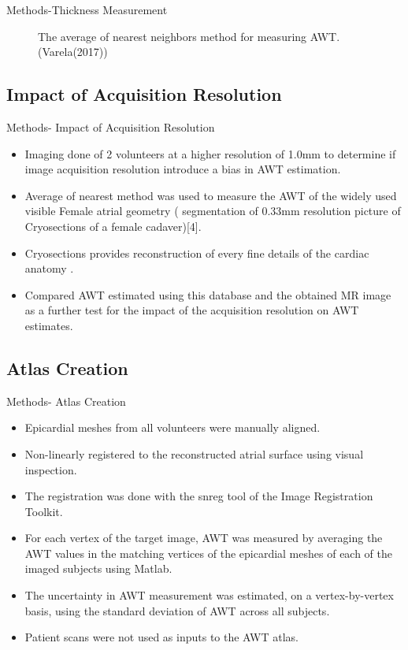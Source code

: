 \documentclass[aspectratio=43]{beamer}
\begin{document}
\begin{frame}{Methods-Thickness Measurement}
\begin{minipage}{0.2\textwidth}
\begin{figure}[h!]
\caption {The average of nearest neighbors method for measuring AWT.(Varela(2017))}
\end{figure}
\end{minipage}

\noindent


\newpage
\subsection{Impact of Acquisition Resolution}
\end{frame}
 
 \begin{frame}{Methods- Impact of Acquisition Resolution}
 \begin{itemize}
 \item Imaging done of 2 volunteers at a higher resolution of 1.0mm to determine if image acquisition resolution introduce a bias in AWT estimation.
 \item Average of nearest method was used to measure the AWT of the widely used visible Female atrial geometry ( segmentation of 0.33mm resolution picture of Cryosections of a female cadaver)[4].
 \item Cryosections provides reconstruction of every fine details of the cardiac anatomy .
 \item Compared AWT estimated using this database and the obtained MR image as a further test for the impact of the acquisition resolution on AWT estimates.
 \end{itemize}
 
 \end{frame}
 
\newpage
\subsection{ Atlas Creation} 
\begin{frame}{Methods- Atlas Creation}
\begin{itemize}
\item Epicardial meshes from all volunteers were manually aligned.
\item Non-linearly registered to the reconstructed atrial surface using visual inspection.
\item The registration was done with the snreg tool of the Image Registration Toolkit.
\item For each vertex of the target image, AWT was measured by averaging the AWT values in the matching vertices of the epicardial meshes of each of the imaged subjects using Matlab.
\item The uncertainty in AWT measurement was estimated, on a vertex-by-vertex basis, using the standard deviation of AWT across all subjects.
\item Patient scans were not used as inputs to the AWT atlas.

\end{itemize}

\end{frame}
\end{document}
